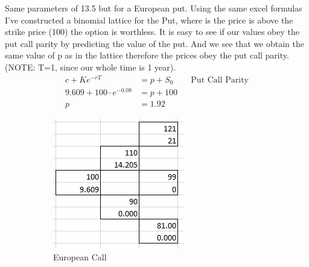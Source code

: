 \documentclass[12pt]{article}
\newenvironment{problem}[3][Problem]{\begin{trivlist}
\item[\hskip \labelsep {\bfseries #1}\hskip \labelsep {\bfseries #2.}]}{\end{trivlist}}
\begin{document}
\begin{problem}{13.6}. Same parameters of 13.5 but for a European put. Using the same excel formulas I\rq{}ve constructed a binomial lattice for the Put, where is the price is above the strike price (100) the option is worthless. It is easy to see if our values obey the put call parity by predicting the value of the put. And we see that we obtain the same value of p as in the lattice therefore the prices obey the put call parity. (NOTE: T=1, since our whole time is 1 year). 
\begin{align*}
c+Ke^{-rT}&= p +S_0 && \text{Put Call Parity} \\
9.609 + 100\cdot e^{-0.08} &= p + 100 \\
p&= 1.92
\end{align*}

\begin{figure}[h!]
\centering
\begin{subfigure}{0.4\textwidth}
\includegraphics[width=\linewidth]{mod9_p1.png}
\caption{European Call}
\end{subfigure}
\begin{subfigure}{0.4\textwidth}

\end{subfigure}
\end{figure}
\end{problem}
\end{document}
